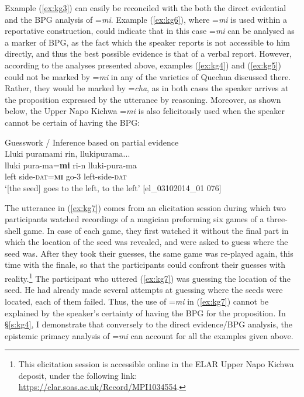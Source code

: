 \documentclass[output=paper]{langscibook}
\begin{document}
Example ‎(\ref{ex:kg3}) can easily be reconciled with the both the direct evidential and the BPG analysis of =\textit{mi}. Example (\ref{ex:kg6}), where =\textit{mi} is used within a reportative construction, could indicate that in this case =\textit{mi} can be analysed as a marker of BPG, as the fact which the speaker reports is not accessible to him directly, and thus the best possible evidence is that of a verbal report. However, according to the analyses presented above, examples (\ref{ex:kg4}) and (\ref{ex:kg5}) could not be marked by =\textit{mi} in any of the varieties of Quechua discussed there. Rather, they would be marked by =\textit{cha}, as in both cases the speaker arrives at the proposition expressed by the utterance by reasoning. Moreover, as shown below, the Upper Napo Kichwa =\textit{mi} is also felicitously used when the speaker cannot be certain of having the BPG:

\begin{exe}
	\ex Guesswork / Inference based on partial evidence\label{ex:kg7}\\
	\glll Lluki puramami rin, llukipurama...\\
	lluki pura-ma=\textbf{mi} ri-n lluki-pura-ma\\
	left side-\textsc{dat}=\textbf{\textsc{mi}} go-3 left-side-\textsc{dat}\\
	\trans ‘[the seed] goes to the left, to the left’ [el\_03102014\_01   076]
\end{exe}

The utterance in (\ref{ex:kg7}) comes from an elicitation session during which two participants watched recordings of a magician preforming six games of a three-shell game. In case of each game, they first watched it without the final part in which the location of the seed was revealed, and were asked to guess where the seed was. After they took their guesses, the same game was re-played again, this time with the finale, so that the participants could confront their guesses with reality.\footnote{This elicitation session is accessible online in the ELAR Upper Napo Kichwa deposit, under the following link: \url{https://elar.soas.ac.uk/Record/MPI1034554}.}  The participant who uttered (\ref{ex:kg7}) was guessing the location of the seed. He had already made several attempts at guessing where the seeds were located, each of them failed. Thus, the use of =\textit{mi} in (\ref{ex:kg7}) cannot be explained by the speaker’s certainty of having the BPG for the proposition. 
In §\ref{s:kg4}, I demonstrate that conversely to the direct evidence/BPG analysis, the epistemic primacy analysis of =\textit{mi} can account for all the examples given above.
\end{document}
